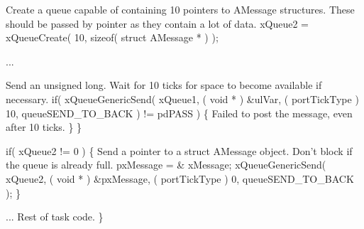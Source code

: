 \begin{DoxyPre}Create a queue capable of containing 10 pointers to AMessage structures.
These should be passed by pointer as they contain a lot of data.
    xQueue2 = xQueueCreate( 10, sizeof( struct AMessage * ) );\end{DoxyPre}



\begin{DoxyPre}...
\begin{DoxyVerb}if( xQueue1 != 0 )
{
\end{DoxyVerb}

Send an unsigned long.  Wait for 10 ticks for space to become
available if necessary.
        if( xQueueGenericSend( xQueue1, ( void * ) \&ulVar, ( portTickType ) 10, queueSEND\_TO\_BACK ) != pdPASS )
        \{
Failed to post the message, even after 10 ticks.
        \}
    \}\end{DoxyPre}



\begin{DoxyPre}    if( xQueue2 != 0 )
    \{
Send a pointer to a struct AMessage object.  Don't block if the
queue is already full.
        pxMessage = \& xMessage;
        xQueueGenericSend( xQueue2, ( void * ) \&pxMessage, ( portTickType ) 0, queueSEND\_TO\_BACK );
    \}\end{DoxyPre}



\begin{DoxyPre}... Rest of task code.
 \}
 \end{DoxyPre}
 